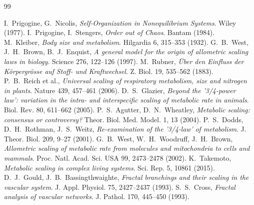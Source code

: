 \documentclass[11pt,a4paper]{article}
\begin{document}
	\begin{thebibliography}{99}
		
		 I.~Prigogine, G.~Nicolis, \emph{Self‑Organization in Nonequilibrium Systems}. Wiley (1977).
		 I.~Prigogine, I.~Stengers, \emph{Order out of Chaos}. Bantam (1984).
		 M.~Kleiber, \emph{Body size and metabolism}. Hilgardia 6, 315–353 (1932).
		 G.~B.~West, J.~H.~Brown, B.~J.~Enquist, \emph{A general model for the origin of allometric scaling laws in biology}. Science 276, 122–126 (1997).
		 M.~Rubner, \emph{Über den Einfluss der Körpergrösse auf Stoff- und Kraftwechsel}. Z. Biol. 19, 535–562 (1883).
		 P.~B.~Reich et al., \emph{Universal scaling of respiratory metabolism, size and nitrogen in plants}. Nature 439, 457–461 (2006).
		 D.~S.~Glazier, \emph{Beyond the '3/4-power law': variation in the intra- and interspecific scaling of metabolic rate in animals}. Biol. Rev. 80, 611–662 (2005).
		 P.~S.~Agutter, D.~N.~Wheatley, \emph{Metabolic scaling: consensus or controversy?} Theor. Biol. Med. Model. 1, 13 (2004).
		 P.~S.~Dodds, D.~H.~Rothman, J.~S.~Weitz, \emph{Re-examination of the '3/4-law' of metabolism}. J. Theor. Biol. 209, 9–27 (2001).
		 G.~B.~West, W.~H.~Woodruff, J.~H.~Brown, \emph{Allometric scaling of metabolic rate from molecules and mitochondria to cells and mammals}. Proc. Natl. Acad. Sci. USA 99, 2473–2478 (2002).
		 K.~Takemoto, \emph{Metabolic scaling in complex living systems}. Sci. Rep. 5, 10861 (2015).
		 D.~J.~Gould, J.~B.~Bassingthwaighte, \emph{Fractal branchings and their scaling in the vascular system}. J. Appl. Physiol. 75, 2427–2437 (1993).
		 S.~S.~Cross, \emph{Fractal analysis of vascular networks}. J. Pathol. 170, 445–450 (1993).
		
	\end{thebibliography}
	
\end{document}
